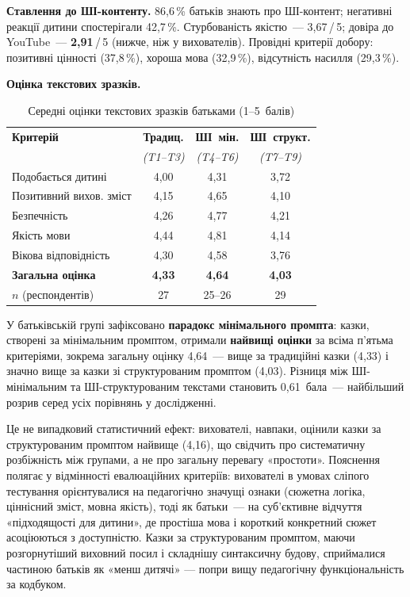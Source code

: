 \documentclass[14pt, a4paper]{extreport}
\begin{document}
\textbf{Ставлення до ШІ-контенту.} 86{,}6\,\% батьків знають про ШІ-контент; негативні реакції дитини спостерігали 42{,}7\,\%. Стурбованість якістю~--- 3{,}67\,/\,5; довіра до YouTube~--- \textbf{2{,}91}\,/\,5 (нижче, ніж у вихователів). Провідні критерії добору: позитивні цінності (37{,}8\,\%), хороша мова (32{,}9\,\%), відсутність насилля (29{,}3\,\%).

\textbf{Оцінка текстових зразків.}

\begin{table}[htbp]
\caption{Середні оцінки текстових зразків батьками (1--5~балів)}
\centering
\begin{tabular}{|l|c|c|c|}
\hline
\rowcolor{tblhead}\textbf{Критерій} & \textbf{Традиц.} & \textbf{ШІ~мін.} & \textbf{ШІ~структ.} \\
\rowcolor{tblhead} & \textit{(T1--T3)} & \textit{(T4--T6)} & \textit{(T7--T9)} \\
\hline
Подобається дитині     & 4{,}00 & 4{,}31 & 3{,}72 \\
Позитивний вихов. зміст & 4{,}15 & 4{,}65 & 4{,}10 \\
Безпечність            & 4{,}26 & 4{,}77 & 4{,}21 \\
Якість мови            & 4{,}44 & 4{,}81 & 4{,}14 \\
Вікова відповідність   & 4{,}30 & 4{,}58 & 3{,}76 \\
\textbf{Загальна оцінка} & \textbf{4{,}33} & \textbf{4{,}64} & \textbf{4{,}03} \\
\hline
$n$ (респондентів) & 27 & 25--26 & 29 \\
\hline
\end{tabular}
\end{table}

У батьківській групі зафіксовано \textbf{парадокс мінімального промпта}: казки, створені за мінімальним промптом, отримали \textbf{найвищі оцінки} за всіма п'ятьма критеріями, зокрема загальну оцінку 4{,}64~--- вище за традиційні казки (4{,}33) і значно вище за казки зі структурованим промптом (4{,}03). Різниця між ШІ-мінімальним та ШІ-структурованим текстами становить 0{,}61~бала~--- найбільший розрив серед усіх порівнянь у дослідженні.

Це не випадковий статистичний ефект: вихователі, навпаки, оцінили казки за структурованим промптом найвище (4{,}16), що свідчить про систематичну розбіжність між групами, а не про загальну перевагу «простоти». Пояснення полягає у відмінності евалюаційних критеріїв: вихователі в умовах сліпого тестування орієнтувалися на педагогічно значущі ознаки (сюжетна логіка, ціннісний зміст, мовна якість), тоді як батьки~--- на суб'єктивне відчуття «підходящості для дитини», де простіша мова і короткий конкретний сюжет асоціюються з доступністю. Казки за структурованим промптом, маючи розгорнутіший виховний посил і складнішу синтаксичну будову, сприймалися частиною батьків як «менш дитячі» --- попри вищу педагогічну функціональність за кодбуком.
\end{document}

